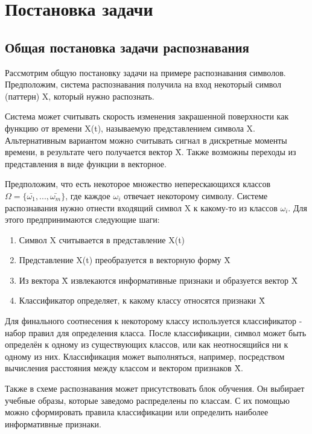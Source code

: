 \documentclass[12pt,a4paper]{article}
\begin{document}
\section{Постановка задачи}
\subsection{Общая постановка задачи распознавания}
Рассмотрим общую постановку задачи на примере распознавания символов. Предположим, система распознавания получила на вход некоторый символ (паттерн) X, который нужно распознать.

Система может считывать скорость изменения закрашенной поверхности как функцию от времени X(t), называемую представлением символа X. Альтернативным вариантом можно считывать сигнал в дискретные моменты времени, в результате чего получается вектор \={X}. Также возможны переходы из представления в виде функции в векторное.

Предположим, что есть некоторое множество неперескающихся классов $\Omega=\{\bar{\omega_1}, ..., \bar{\omega_m}\}$, где каждое $\omega_i$ отвечает некоторому символу. Системе распознавания нужно отнести входящий символ X к какому-то из классов $\omega_i$. Для этого предпринимаются следующие шаги:
\begin{enumerate}
    \item Символ X считывается в представление X(t)
    \item Представление X(t) преобразуется в векторную форму \=X
    \item Из вектора \=X извлекаются информативные признаки и образуется вектор \^X
    \item Классификатор определяет, к какому классу относятся признаки \^X
\end{enumerate}

Для финального соотнесения к некоторому классу используется классификатор - набор правил для определения класса. После классификации, символ может быть определён к одному из существующих классов, или как неотносящийся ни к одному из них. Классификация может выполняться, например, посредством вычисления расстояния между классом и вектором признаков \^X.

Также в схеме распознавания может присутствовать блок обучения. Он выбирает учебные образы, которые заведомо распределены по классам. С их помощью можно сформировать правила классификации или определить наиболее информативные признаки.
\end{document}
